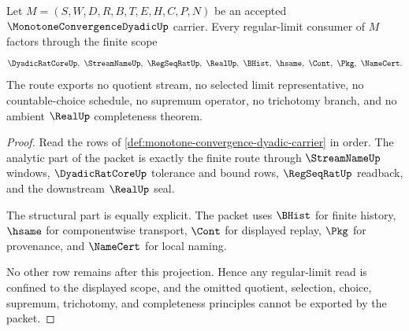 \begin{theorem}
\label{thm:monotone-convergence-dyadic-regular-limit-scope}
Let $M=(S,W,D,R,B,T,E,H,C,P,N)$ be an accepted $\MonotoneConvergenceDyadicUp$ carrier. Every regular-limit consumer of $M$ factors through the finite scope
$$
\DyadicRatCoreUp,\ \StreamNameUp,\ \RegSeqRatUp,\ \RealUp,\ \BHist,\ \hsame,\ \Cont,\ \Pkg,\ \NameCert .
$$
The route exports no quotient stream, no selected limit representative, no countable-choice schedule, no supremum operator, no trichotomy branch, and no ambient $\RealUp$ completeness theorem.
\end{theorem}
\begin{proof}
Read the rows of \autoref{def:monotone-convergence-dyadic-carrier} in order. The analytic part of the packet is exactly the finite route through $\StreamNameUp$ windows, $\DyadicRatCoreUp$ tolerance and bound rows, $\RegSeqRatUp$ readback, and the downstream $\RealUp$ seal.

The structural part is equally explicit. The packet uses $\BHist$ for finite history, $\hsame$ for componentwise transport, $\Cont$ for displayed replay, $\Pkg$ for provenance, and $\NameCert$ for local naming.

No other row remains after this projection. Hence any regular-limit read is confined to the displayed scope, and the omitted quotient, selection, choice, supremum, trichotomy, and completeness principles cannot be exported by the packet.
\end{proof}




